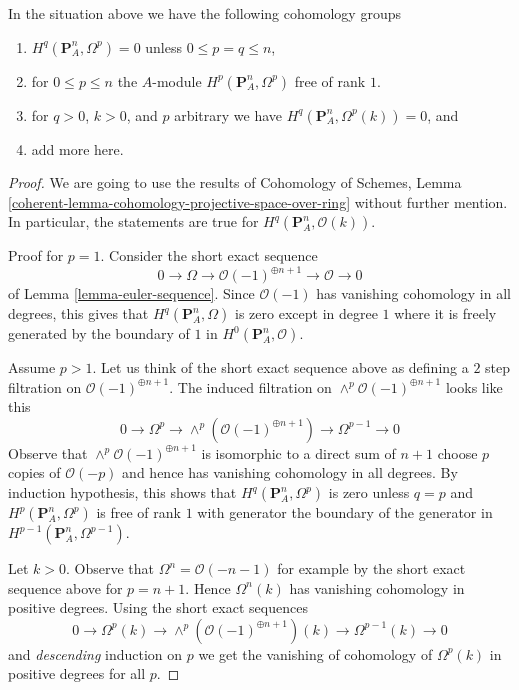 \begin{lemma}
\label{lemma-twisted-hodge-cohomology-projective-space}
In the situation above we have the following cohomology groups
\begin{enumerate}
\item $H^q(\mathbf{P}^n_A, \Omega^p) = 0$
unless $0 \leq p = q \leq n$,
\item for $0 \leq p \leq n$ the $A$-module
$H^p(\mathbf{P}^n_A, \Omega^p)$ free of rank $1$.
\item for $q > 0$, $k > 0$, and $p$ arbitrary we have
$H^q(\mathbf{P}^n_A, \Omega^p(k)) = 0$, and
\item add more here.
\end{enumerate}
\end{lemma}

\begin{proof}
We are going to use the results of Cohomology of Schemes, Lemma
\ref{coherent-lemma-cohomology-projective-space-over-ring}
without further mention. In particular, the statements are true
for $H^q(\mathbf{P}^n_A, \mathcal{O}(k))$.

\medskip\noindent
Proof for $p = 1$. Consider the short exact sequence
$$
0 \to \Omega \to \mathcal{O}(-1)^{\oplus n + 1} \to \mathcal{O} \to 0
$$
of Lemma \ref{lemma-euler-sequence}. Since $\mathcal{O}(-1)$ has
vanishing cohomology in all degrees, this gives that
$H^q(\mathbf{P}^n_A, \Omega)$ is zero except in degree $1$
where it is freely generated by the boundary of $1$ in
$H^0(\mathbf{P}^n_A, \mathcal{O})$.

\medskip\noindent
Assume $p > 1$. Let us think of the short exact sequence
above as defining a $2$ step filtration on $\mathcal{O}(-1)^{\oplus n + 1}$.
The induced filtration on $\wedge^p\mathcal{O}(-1)^{\oplus n + 1}$ looks
like this
$$
0 \to \Omega^p \to \wedge^p\left(\mathcal{O}(-1)^{\oplus n + 1}\right)
\to \Omega^{p - 1} \to 0
$$
Observe that $\wedge^p\mathcal{O}(-1)^{\oplus n + 1}$ is isomorphic
to a direct sum of $n + 1$ choose $p$ copies of $\mathcal{O}(-p)$
and hence has vanishing cohomology in all degrees.
By induction hypothesis, this shows that $H^q(\mathbf{P}^n_A, \Omega^p)$
is zero unless $q = p$ and $H^p(\mathbf{P}^n_A, \Omega^p)$ is free
of rank $1$ with generator the boundary of the generator in
$H^{p - 1}(\mathbf{P}^n_A, \Omega^{p - 1})$.

\medskip\noindent
Let $k > 0$. Observe that $\Omega^n = \mathcal{O}(-n - 1)$ for example
by the short exact sequence above for $p = n + 1$.
Hence $\Omega^n(k)$ has vanishing cohomology in positive degrees.
Using the short exact sequences
$$
0 \to \Omega^p(k) \to \wedge^p\left(\mathcal{O}(-1)^{\oplus n + 1}\right)(k)
\to \Omega^{p - 1}(k) \to 0
$$
and {\it descending} induction on $p$ we get the vanishing of
cohomology of $\Omega^p(k)$ in positive degrees for all $p$.
\end{proof}

